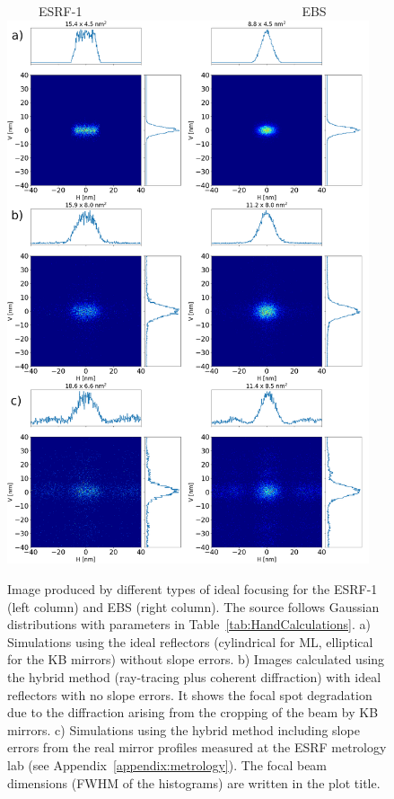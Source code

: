 \documentclass{iucr}              %
\newcommand{\inred}[1]{{\color{black}#1}}
\begin{document}
\begin{figure}
\label{fig:ray-tracing}
\centering
~~~~~ESRF-1~~~~~~~~~~~~~~~~~~~~~~~~~~~~~~~~~~~EBS
\newline
\includegraphics[width=0.95\textwidth]{GRAPHICS/figure3.png}
\caption{Image produced by different types of ideal focusing for the \inred{ESRF-1} (left column) and EBS (right column). The source follows Gaussian distributions with parameters in Table~\ref{tab:HandCalculations}. 
a) Simulations using the ideal reflectors (cylindrical for ML, elliptical for the KB mirrors) without slope errors. 
b) Images calculated using the hybrid method (ray-tracing plus coherent diffraction) with ideal reflectors with no slope errors. It shows the focal spot degradation due to the diffraction arising from the cropping of the beam by KB mirrors. c) Simulations using the hybrid method including slope errors from the real mirror profiles measured at the ESRF metrology lab (see Appendix~\ref{appendix:metrology}). 
The focal beam dimensions (FWHM of the histograms) are written in the plot title.
}
\end{figure}
\end{document}

